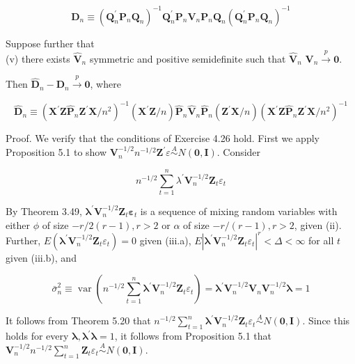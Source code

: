 \documentclass[10pt]{article}
\begin{document}
$$
\mathbf{D}_{n} \equiv\left(\mathbf{Q}_{n}^{\prime} \mathbf{P}_{n} \mathbf{Q}_{n}\right)^{-1} \mathbf{Q}_{n}^{\prime} \mathbf{P}_{n} \mathbf{V}_{n} \mathbf{P}_{n} \mathbf{Q}_{n}\left(\mathbf{Q}_{n}^{\prime} \mathbf{P}_{n} \mathbf{Q}_{n}\right)^{-1}
$$

Suppose further that\\
(v) there exists $\hat{\mathbf{V}}_{n}$ symmetric and positive semidefinite such that $\hat{\mathbf{V}}_{n}$ $\mathbf{V}_{n} \xrightarrow{p} \mathbf{0}$.

Then $\hat{\mathbf{D}}_{n}-\mathbf{D}_{n} \xrightarrow{p} \mathbf{0}$, where

$$
\hat{\mathbf{D}}_{n} \equiv\left(\mathbf{X}^{\prime} \mathbf{Z} \hat{\mathbf{P}}_{n} \mathbf{Z}^{\prime} \mathbf{X} / n^{2}\right)^{-1}\left(\mathbf{X}^{\prime} \mathbf{Z} / n\right) \hat{\mathbf{P}}_{n} \hat{\mathbf{V}}_{n} \hat{\mathbf{P}}_{n}\left(\mathbf{Z}^{\prime} \mathbf{X} / n\right)\left(\mathbf{X}^{\prime} \mathbf{Z} \hat{\mathbf{P}}_{n} \mathbf{Z}^{\prime} \mathbf{X} / n^{2}\right)^{-1}
$$

Proof. We verify that the conditions of Exercise 4.26 hold. First we apply Proposition 5.1 to show $\mathbf{V}_{n}^{-1 / 2} n^{-1 / 2} \mathbf{Z}^{\prime} \varepsilon \stackrel{A}{\sim} N(\mathbf{0}, \mathbf{I})$. Consider

$$
n^{-1 / 2} \sum_{t=1}^{n} \lambda^{\prime} \mathbf{V}_{n}^{-1 / 2} \mathbf{Z}_{t} \varepsilon_{t}
$$

By Theorem 3.49, $\boldsymbol{\lambda}^{\prime} \mathbf{V}_{n}^{-1 / 2} \mathbf{Z}_{t} \boldsymbol{\varepsilon}_{t}$ is a sequence of mixing random variables with either $\phi$ of size $-r / 2(r-1), r>2$ or $\alpha$ of size $-r /(r-1), r>2$, given (ii). Further, $E\left(\boldsymbol{\lambda}^{\prime} \mathbf{V}_{n}^{-1 / 2} \mathbf{Z}_{t} \varepsilon_{t}\right)=0$ given (iii.a), $E\left|\boldsymbol{\lambda}^{\prime} \mathbf{V}_{n}^{-1 / 2} \mathbf{Z}_{t} \varepsilon_{t}\right|^{r}<\Delta< \infty$ for all $t$ given (iii.b), and

$$
\bar{\sigma}_{n}^{2} \equiv \operatorname{var}\left(n^{-1 / 2} \sum_{t=1}^{n} \boldsymbol{\lambda}^{\prime} \mathbf{V}_{n}^{-1 / 2} \mathbf{Z}_{t} \varepsilon_{t}\right)=\boldsymbol{\lambda}^{\prime} \mathbf{V}_{n}^{-1 / 2} \mathbf{V}_{n} \mathbf{V}_{n}^{-1 / 2} \boldsymbol{\lambda}=1
$$

It follows from Theorem 5.20 that $n^{-1 / 2} \sum_{t=1}^{n} \boldsymbol{\lambda}^{\prime} \mathbf{V}_{n}^{-1 / 2} \mathbf{Z}_{t} \varepsilon_{t} \stackrel{A}{\sim} N(\mathbf{0}, \mathbf{I})$. Since this holds for every $\boldsymbol{\lambda}, \boldsymbol{\lambda}^{\prime} \boldsymbol{\lambda}=1$, it follows from Proposition 5.1 that $\mathbf{V}_{n}^{-1 / 2} n^{-1 / 2} \sum_{t=1}^{n} \mathbf{Z}_{t} \varepsilon_{t} \stackrel{A}{\sim} N(\mathbf{0}, \mathbf{I})$.
\end{document}
